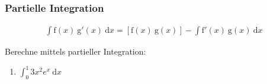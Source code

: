 \documentclass[11pt, a4paper]{article}
\newcommand\braces[1]{\left(#1\right)}
\newcommand\brackets[1]{\left[#1\right]}
\newcommand{\intend}[1][]{\ \mathrm{d}#1}
\newif\ifshowsolution
\begin{document}
\begin{enumerate}
	\ifshowsolution
		\begin{align*}
			\shortintertext{Substituiere: $3 \cos x = t$}
			\shortintertext{$\frac{\intend{t}}{\intend{x}} = -3 \sin x \Leftrightarrow \intend{x} = \frac{\intend{t}}{-3 \sin x}$}
			\int_\frac{\pi}{2}^\pi e^{3 \cos x} \cdot \sin x \intend{x} &= \int_{t(\frac{\pi}{2})}^{t{\pi}} e^t \cdot \cancel{\sin x} \ \frac{\intend{t}}{-3 \ \cancel{\sin x}} \\
			&= \int_{t(\frac{\pi}{2})}^{t{\pi}} e^t \frac{1}{-3} \intend{t} \\
			&= -\frac{1}{3} \int_{t(\frac{\pi}{2})}^{t{\pi}} e^t\intend{t} \\
			&= -\frac{1}{3} \brackets{e^t}_{t(\frac{\pi}{2})}^{t(\pi)} \\
			&= -\frac{1}{3} \brackets{e^t}_{3 \cos(\frac{\pi}{2})}^{3 \cos(\pi)} \\
			&= -\frac{1}{3} \brackets{e^t}_0^{-3} \\
			&= -\frac{1}{3} \braces{e^{-3} - \underbrace{e^0}_{= 1}} \\
			&\approx 0.3167
			\shortintertext{Oder: Rücksubstitution nach Integration}
			-\frac{1}{3} \left[ e^t \right]_{t(\frac{\pi}{2})}^{t(\pi)} &= -\frac{1}{3} \left[ e^{3 \cos x} \right]_{\frac{\pi}{2}}^\pi \\
			&= -\frac{1}{3} \braces{e^{3 \cos \pi} - e^{3 \cos \frac{\pi}{2}}} \\
			&= -\frac{1}{3} \braces{e^{-3} - e^0} \\
			&\approx 0.3167
		\end{align*}
	\fi
\end{enumerate}

\subsubsection{Partielle Integration}
\begin{align*}
	\int \mathrm{f}(x) \ \mathrm{g}'(x) \intend{x} = \brackets{\mathrm{f}(x) \ \mathrm{g}(x)} - \int \mathrm{f}'(x) \ \mathrm{g}(x) \intend{x}
\end{align*}

Berechne mittels partieller Integration:
\begin{enumerate}
	\item $\int_0^1 3x^2 e^x \intend{x}$
	
	\ifshowsolution
		\begin{align*}
			\int_0^1 \underbrace{3x^2}_\mathrm{f} \underbrace{e^x}_\mathrm{g'} \intend{x} &= \brackets{3x^2 e^x}_0^1 - \int_0^1 \underbrace{6x}_\mathrm{f} \ \underbrace{e^x}_\mathrm{g'} \intend{x} \\
			&= \brackets{3x^2 e^x}_0^1 - \braces{ \brackets{6x \ e^x}_0^1 - \int_0^1 6 e^x \intend{x} } \\
			&= \brackets{3x^2 e^x}_0^1 - \brackets{6x \ e^x}_0^1 + 6 \int_0^1 e^x \intend{x} \\
			&= \brackets{3x^2 e^x}_0^1 - \brackets{6x \ e^x}_0^1 + 6 \brackets{e^x}_0^1 \\
			&= \braces{3 e - 0} - \braces{6 e - 0} + 6 \braces{e - 1} \\
			&= 3e - 6
		\end{align*}
	\fi
\end{enumerate}
\end{document}

